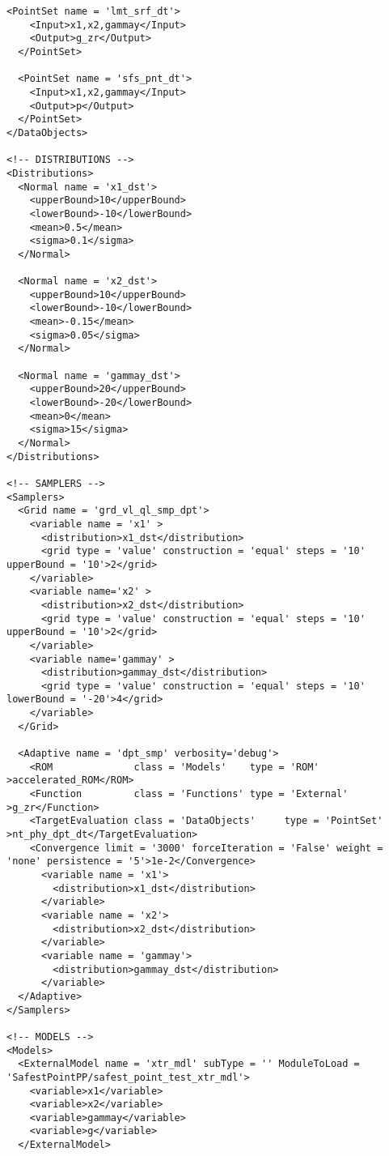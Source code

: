 \begin{lstlisting}[style=XML,morekeywords={debug,re,seeding,class,subType,limit}]
  <PointSet name = 'lmt_srf_dt'>
    <Input>x1,x2,gammay</Input>
    <Output>g_zr</Output>
  </PointSet>
  
  <PointSet name = 'sfs_pnt_dt'>
    <Input>x1,x2,gammay</Input>
    <Output>p</Output>
  </PointSet>
</DataObjects>

<!-- DISTRIBUTIONS -->
<Distributions>
  <Normal name = 'x1_dst'>
    <upperBound>10</upperBound>
    <lowerBound>-10</lowerBound>
  	<mean>0.5</mean>
    <sigma>0.1</sigma>
  </Normal>
  
  <Normal name = 'x2_dst'>
    <upperBound>10</upperBound>
    <lowerBound>-10</lowerBound>
    <mean>-0.15</mean>
    <sigma>0.05</sigma>
  </Normal>
  
  <Normal name = 'gammay_dst'>
    <upperBound>20</upperBound>
    <lowerBound>-20</lowerBound>
    <mean>0</mean>
    <sigma>15</sigma>
  </Normal>
</Distributions>

<!-- SAMPLERS -->
<Samplers>  
  <Grid name = 'grd_vl_ql_smp_dpt'>
    <variable name = 'x1' >
      <distribution>x1_dst</distribution>
      <grid type = 'value' construction = 'equal' steps = '10' upperBound = '10'>2</grid>
    </variable>  
    <variable name='x2' >
      <distribution>x2_dst</distribution>
      <grid type = 'value' construction = 'equal' steps = '10' upperBound = '10'>2</grid>
    </variable>
    <variable name='gammay' >
      <distribution>gammay_dst</distribution>
      <grid type = 'value' construction = 'equal' steps = '10' lowerBound = '-20'>4</grid>
    </variable>
  </Grid>
  
  <Adaptive name = 'dpt_smp' verbosity='debug'>
    <ROM              class = 'Models'    type = 'ROM'           >accelerated_ROM</ROM>
    <Function         class = 'Functions' type = 'External'      >g_zr</Function>
    <TargetEvaluation class = 'DataObjects'     type = 'PointSet'  >nt_phy_dpt_dt</TargetEvaluation>
    <Convergence limit = '3000' forceIteration = 'False' weight = 'none' persistence = '5'>1e-2</Convergence>
      <variable name = 'x1'>
        <distribution>x1_dst</distribution>
      </variable>
      <variable name = 'x2'>
        <distribution>x2_dst</distribution>
      </variable>
      <variable name = 'gammay'>
        <distribution>gammay_dst</distribution>
      </variable>
  </Adaptive>
</Samplers>

<!-- MODELS -->
<Models>  
  <ExternalModel name = 'xtr_mdl' subType = '' ModuleToLoad = 'SafestPointPP/safest_point_test_xtr_mdl'>
    <variable>x1</variable>
    <variable>x2</variable>
    <variable>gammay</variable>
    <variable>g</variable>
  </ExternalModel>
  

\end{lstlisting}
